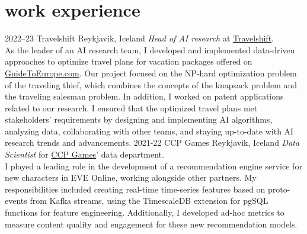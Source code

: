 \section{work experience}
\begin{entrylist}
\entry
{2022--23}
{Travelshift}
{Reykjavik, Iceland}
{\emph{Head of AI research} at \href{https://www.travelshift.com/}{Travelshift}.\\
As the leader of an AI research team, I developed and implemented data-driven approaches to optimize travel plans for vacation packages offered on \href{www.guidetoeurope.com}{GuideTo\-Europe.com}. Our project focused on the NP-hard optimization problem of the traveling thief, which combines the concepts of the knapsack problem and the traveling salesman problem. 
In addition, I worked on patent applications related to our research.
I ensured that the optimized travel plans met stakeholders' requirements by designing and implementing AI algorithms, analyzing data, collaborating with other teams, and staying up-to-date with AI research trends and advancements.}
\entry
{2021-22}
{CCP Games}
{Reykjavik, Iceland}
{\emph{Data Scientist} for \href{https://www.ccpgames.com/}{CCP Games}' data department.\\
I played a leading role in the development of a recommendation engine service for new characters in EVE Online, working alongside other partners. My responsibilities included creating real-time time-series features based on proto-events from Kafka streams, using the TimescaleDB extension for pgSQL functions for feature engineering. Additionally, I developed ad-hoc metrics to measure content quality and engagement for these new recommendation models.
}
\end{entrylist}
